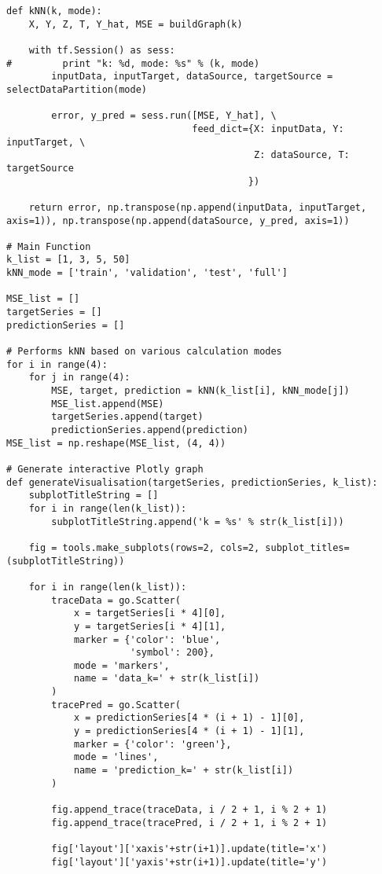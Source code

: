 \documentclass[a4paper,12pt]{article}
\begin{document}
\begin{verbatim}
def kNN(k, mode):
    X, Y, Z, T, Y_hat, MSE = buildGraph(k)
    
    with tf.Session() as sess:
#         print "k: %d, mode: %s" % (k, mode)
        inputData, inputTarget, dataSource, targetSource = selectDataPartition(mode)
            
        error, y_pred = sess.run([MSE, Y_hat], \
                                 feed_dict={X: inputData, Y: inputTarget, \
                                            Z: dataSource, T: targetSource
                                           })
        
    return error, np.transpose(np.append(inputData, inputTarget, axis=1)), np.transpose(np.append(dataSource, y_pred, axis=1))

# Main Function
k_list = [1, 3, 5, 50]
kNN_mode = ['train', 'validation', 'test', 'full']

MSE_list = []
targetSeries = []
predictionSeries = []

# Performs kNN based on various calculation modes
for i in range(4):
    for j in range(4):
        MSE, target, prediction = kNN(k_list[i], kNN_mode[j])
        MSE_list.append(MSE)
        targetSeries.append(target)
        predictionSeries.append(prediction)
MSE_list = np.reshape(MSE_list, (4, 4))

# Generate interactive Plotly graph
def generateVisualisation(targetSeries, predictionSeries, k_list):
    subplotTitleString = []
    for i in range(len(k_list)):
        subplotTitleString.append('k = %s' % str(k_list[i]))
    
    fig = tools.make_subplots(rows=2, cols=2, subplot_titles=(subplotTitleString))

    for i in range(len(k_list)):
        traceData = go.Scatter(
            x = targetSeries[i * 4][0],
            y = targetSeries[i * 4][1],
            marker = {'color': 'blue',
                      'symbol': 200},
            mode = 'markers',
            name = 'data_k=' + str(k_list[i])
        )
        tracePred = go.Scatter(
            x = predictionSeries[4 * (i + 1) - 1][0], 
            y = predictionSeries[4 * (i + 1) - 1][1],
            marker = {'color': 'green'},
            mode = 'lines',
            name = 'prediction_k=' + str(k_list[i])
        )

        fig.append_trace(traceData, i / 2 + 1, i % 2 + 1)
        fig.append_trace(tracePred, i / 2 + 1, i % 2 + 1)
          
        fig['layout']['xaxis'+str(i+1)].update(title='x')
        fig['layout']['yaxis'+str(i+1)].update(title='y')
        

\end{verbatim}
\end{document}
